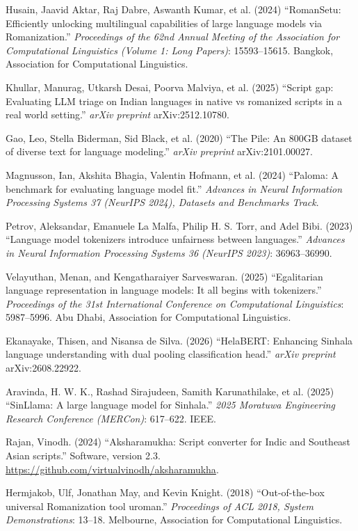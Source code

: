 Husain, Jaavid Aktar, Raj Dabre, Aswanth Kumar, et al. (2024) ``RomanSetu: Efficiently unlocking multilingual capabilities of large language models via Romanization.'' {\it Proceedings of the 62nd Annual Meeting of the Association for Computational Linguistics (Volume 1: Long Papers)}: 15593--15615. Bangkok, Association for Computational Linguistics.

Khullar, Manurag, Utkarsh Desai, Poorva Malviya, et al. (2025) ``Script gap: Evaluating LLM triage on Indian languages in native vs romanized scripts in a real world setting.'' {\it arXiv preprint} arXiv:2512.10780.

Gao, Leo, Stella Biderman, Sid Black, et al. (2020) ``The Pile: An 800GB dataset of diverse text for language modeling.'' {\it arXiv preprint} arXiv:2101.00027.

Magnusson, Ian, Akshita Bhagia, Valentin Hofmann, et al. (2024) ``Paloma: A benchmark for evaluating language model fit.'' {\it Advances in Neural Information Processing Systems 37 (NeurIPS 2024), Datasets and Benchmarks Track}.

Petrov, Aleksandar, Emanuele La Malfa, Philip H. S. Torr, and Adel Bibi. (2023) ``Language model tokenizers introduce unfairness between languages.'' {\it Advances in Neural Information Processing Systems 36 (NeurIPS 2023)}: 36963--36990.

Velayuthan, Menan, and Kengatharaiyer Sarveswaran. (2025) ``Egalitarian language representation in language models: It all begins with tokenizers.'' {\it Proceedings of the 31st International Conference on Computational Linguistics}: 5987--5996. Abu Dhabi, Association for Computational Linguistics.

Ekanayake, Thisen, and Nisansa de Silva. (2026) ``HelaBERT: Enhancing Sinhala language understanding with dual pooling classification head.'' {\it arXiv preprint} arXiv:2608.22922.

Aravinda, H. W. K., Rashad Sirajudeen, Samith Karunathilake, et al. (2025) ``SinLlama: A large language model for Sinhala.'' {\it 2025 Moratuwa Engineering Research Conference (MERCon)}: 617--622. IEEE.

Rajan, Vinodh. (2024) ``Aksharamukha: Script converter for Indic and Southeast Asian scripts.'' Software, version 2.3. \url{https://github.com/virtualvinodh/aksharamukha}.

Hermjakob, Ulf, Jonathan May, and Kevin Knight. (2018) ``Out-of-the-box universal Romanization tool uroman.'' {\it Proceedings of ACL 2018, System Demonstrations}: 13--18. Melbourne, Association for Computational Linguistics.

